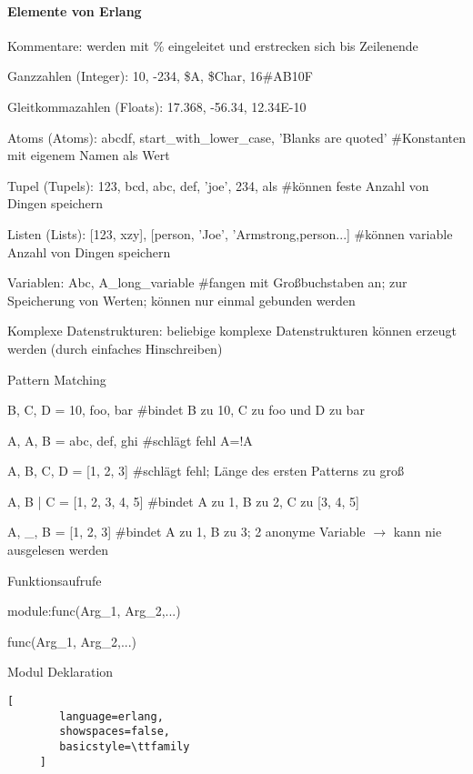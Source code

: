 \documentclass[10pt]{article}
\begin{document}
\paragraph{Elemente von Erlang}
\begin{itemize*}
  \item Kommentare: werden mit \% eingeleitet und erstrecken sich bis Zeilenende
  \item Ganzzahlen (Integer): 10, -234, \$A, \$Char, 16\#AB10F
  \item Gleitkommazahlen (Floats): 17.368, -56.34, 12.34E-10
  \item Atoms (Atoms): abcdf, start\_with\_lower\_case, 'Blanks are quoted' \#Konstanten mit eigenem Namen als Wert
  \item Tupel (Tupels): {123, bcd}, {abc, {def, 'joe', 234}, als} \#können feste Anzahl von Dingen speichern
  \item Listen (Lists): [123, xzy], [{person, 'Joe', 'Armstrong},{person...}] \#können variable Anzahl von Dingen speichern
  \item Variablen: Abc, A\_long\_variable \#fangen mit Großbuchstaben an; zur Speicherung von Werten; können nur einmal gebunden werden
  \item Komplexe Datenstrukturen: beliebige komplexe Datenstrukturen können erzeugt werden (durch einfaches Hinschreiben)
  \item Pattern Matching
  \begin{itemize*}
    \item {B, C, D} = {10, foo, bar} \#bindet B zu 10, C zu foo und D zu bar
    \item {A, A, B} = {abc, def, ghi} \#schlägt fehl A=!A
    \item [A, B, C, D] = [1, 2, 3] \#schlägt fehl; Länge des ersten Patterns zu groß
    \item [A, B | C] = [1, 2, 3, 4, 5] \#bindet A zu 1, B zu 2, C zu [3, 4, 5]
    \item [A, \_, B ] = [1, 2, 3] \#bindet A zu 1, B zu 3; 2 anonyme Variable $\rightarrow$ kann nie ausgelesen werden
  \end{itemize*}
  \item Funktionsaufrufe
  \begin{itemize*}
    \item module:func(Arg\_1, Arg\_2,...)
    \item func(Arg\_1, Arg\_2,...)
  \end{itemize*}
  \item Modul Deklaration
  \begin{lstlisting}[
        language=erlang,
        showspaces=false,
        basicstyle=\ttfamily
     ]

\end{lstlisting}
\end{itemize*}
\end{document}
